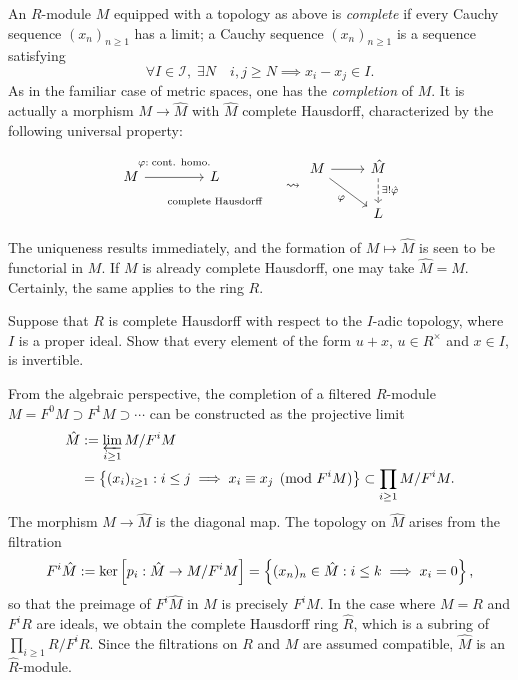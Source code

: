 An $R$-module $M$ equipped with a topology as above is \emph{complete} if every Cauchy sequence $(x_n)_{n \geq 1}$ has a limit; a Cauchy sequence $(x_n)_{n \geq 1}$ is a sequence satisfying
\[ \forall I \in \mathcal{I}, \; \exists N \quad i,j \geq N \implies x_i - x_j \in I. \]
As in the familiar case of metric spaces, one has the \emph{completion} of $M$. It is actually a morphism $M \to \hat{M}$ with $\hat{M}$ complete Hausdorff, characterized by the following universal property:
\[
\begin{tikzcd}[row sep=tiny, column sep=tiny]
	M \arrow[rr, "\varphi:\; \text{cont. homo.}" inner sep=0.7em] & & L \\
	& & \scriptsize\text{complete Hausdorff}
\end{tikzcd} \quad \leadsto
\begin{tikzcd}
	M \arrow[rd, "\varphi"'] \arrow[r] & \hat{M} \arrow[dashed, d, "\exists! \hat{\varphi}"] \\
	& L
\end{tikzcd}\]

The uniqueness results immediately, and the formation of $M \mapsto \hat{M}$ is seen to be functorial in $M$. If $M$ is already complete Hausdorff, one may take $\hat{M} = M$. Certainly, the same applies to the ring $R$.

\begin{exercise}
	Suppose that $R$ is complete Hausdorff with respect to the $I$-adic topology, where $I$ is a proper ideal. Show that every element of the form $u+x$, $u \in R^\times$ and $x \in I$, is invertible.
\end{exercise}

From the algebraic perspective, the completion of a filtered $R$-module $M = F^0 M \supset F^1 M \supset \cdots$ can be constructed as the projective limit
\begin{align*}
	\hat{M} & := \varprojlim_{i \geq 1} M/F^i M \\
	& = \left\{ (x_i)_{i \geq 1} : i \leq j \implies x_i \equiv x_j \pmod{F^i M} \right\} \subset \prod_{i \geq 1} M/F^i M.
\end{align*}
The morphism $M \to \hat{M}$ is the diagonal map. The topology on $\hat{M}$ arises from the filtration
\[ F^i \hat{M} := \operatorname{ker}\left[ p_i: \hat{M} \to M/F^i M \right] = \left\{ (x_n)_n \in \hat{M}: i \leq k \implies x_i=0 \right\}, \]
so that the preimage of $F^i \hat{M}$ in $M$ is precisely $F^i M$. In the case where $M=R$ and $F^i R$ are ideals, we obtain the complete Hausdorff ring $\hat{R}$, which is a subring of $\prod_{i \geq 1} R/F^i R$. Since the filtrations on $R$ and $M$ are assumed compatible, $\hat{M}$ is an $\hat{R}$-module.

